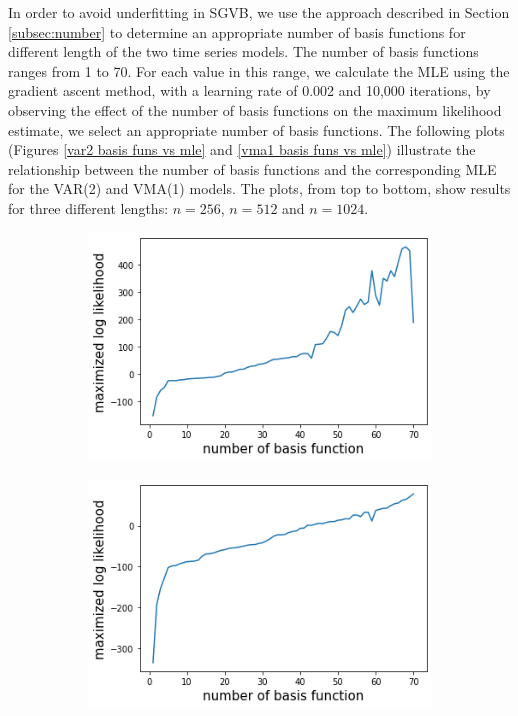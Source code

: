 \documentclass[%
 reprint,
 amsmath,amssymb,
 aps,
]{revtex4-2}
\begin{document}
In order to avoid underfitting in SGVB, we use the approach described in Section \ref{subsec:number} to determine an appropriate number of basis functions for different length of the two time series models. The number of basis functions ranges from 1 to 70. For each value in this range, we calculate the MLE using the gradient ascent method, with a learning rate of 0.002 and 10,000 iterations, by observing the effect of the number of basis functions on the maximum likelihood estimate, we select an appropriate number of basis functions. The following plots (Figures \ref{var2 basis funs vs mle} and \ref{vma1 basis funs vs mle}) illustrate the relationship between the number of basis functions and the corresponding MLE for the VAR(2) and VMA(1) models. The plots, from top to bottom, show results for three different lengths: $n=256$, $n=512$ and $n=1024$.
\begin{figure}
\centering
\begin{subfigure}{\textwidth} %
  \centering
  \includegraphics[width=10cm]{num basis funs vs mle var2 256.png}
\end{subfigure}

\begin{subfigure}{\textwidth} %
  \centering
  \includegraphics[width=10cm]{num basis funs vs mle var2 512.png}
\end{subfigure}


\end{figure}
\end{document}
